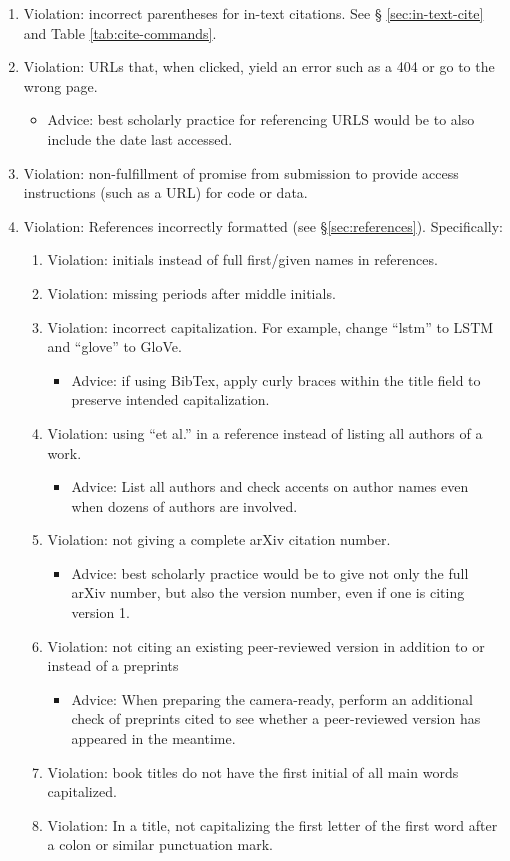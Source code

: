 \documentclass[11pt,a4paper]{article}
\begin{document}
\begin{enumerate}
\item Violation: incorrect parentheses for in-text citations.  See \S
\ref{sec:in-text-cite} and Table \ref{tab:cite-commands}.
\item Violation: URLs that, when clicked, yield an error such as a 404 or go
to the wrong page.
  \begin{itemize}
     \item Advice: best scholarly practice for referencing URLS would be to also
     include the date last accessed.
  \end{itemize}
\item Violation: non-fulfillment of promise from submission to provide access
instructions (such as a URL) for code or data.
\item Violation: References incorrectly formatted (see \S\ref{sec:references}).
Specifically:
\begin{enumerate}
  \item Violation: initials instead of full first/given names in references.
  \item Violation: missing periods after middle initials.
  \item Violation: incorrect capitalization.  For example, change ``lstm'' to
  LSTM and ``glove'' to GloVe.
  \begin{itemize}
    \item Advice: if using BibTex, apply curly braces within the title field to
    preserve intended capitalization.
  \end{itemize}
  \item Violation: using ``et al.'' in a reference instead of listing all
  authors of a work.
  \begin{itemize}
    \item Advice: List all authors and check accents on author names even when
    dozens of authors are involved.
  \end{itemize}
  \item Violation: not giving a complete arXiv citation number.
  \begin{itemize}
     \item Advice: best scholarly practice would be to give not only the full
     arXiv number, but also the version number, even if one is citing version 1.
  \end{itemize}
  \item Violation: not citing an existing peer-reviewed version in addition to
  or instead of a preprints
    \begin{itemize}
     \item Advice: When preparing the camera-ready, perform an additional check
     of preprints cited to see whether a peer-reviewed version has appeared
     in the meantime.
  \end{itemize}
  \item Violation: book titles do not have the first initial of all main words
  capitalized.
  \item Violation: In a title, not capitalizing the first letter of the first word
  after a colon or similar punctuation mark.
\end{enumerate}
\end{enumerate}
\else
\end{document}
